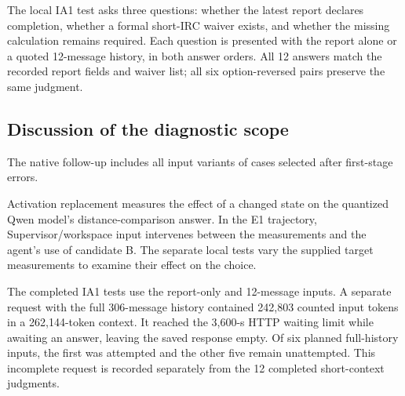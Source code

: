 The local IA1 test asks three questions: whether the latest report declares completion, whether a formal short-IRC waiver exists, and whether the missing calculation remains required. Each question is presented with the report alone or a quoted 12-message history, in both answer orders. All 12 answers match the recorded report fields and waiver list; all six option-reversed pairs preserve the same judgment.

\subsection{Discussion of the diagnostic scope}

The native follow-up includes all input variants of cases selected after first-stage errors.

Activation replacement measures the effect of a changed state on the quantized Qwen model's distance-comparison answer. In the E1 trajectory, Supervisor/workspace input intervenes between the measurements and the agent's use of candidate B. The separate local tests vary the supplied target measurements to examine their effect on the choice.

The completed IA1 tests use the report-only and 12-message inputs. A separate request with the full 306-message history contained 242,803 counted input tokens in a 262,144-token context. It reached the 3,600-s HTTP waiting limit while awaiting an answer, leaving the saved response empty. Of six planned full-history inputs, the first was attempted and the other five remain unattempted. This incomplete request is recorded separately from the 12 completed short-context judgments.
